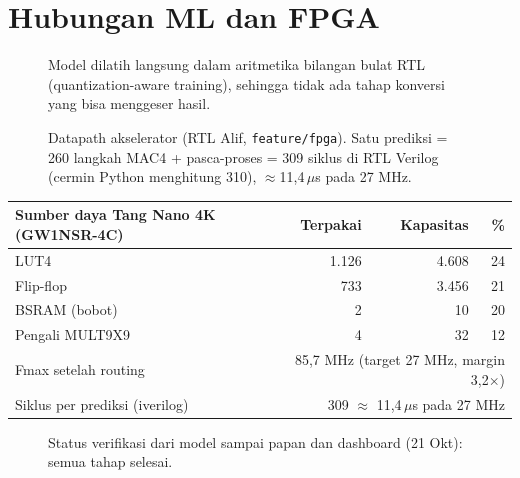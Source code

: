 \documentclass[10.5pt,a4paper]{article}
\newcommand{\diagram}[1]{}
\newcommand{\cmd}[1]{\texttt{#1}}
\begin{document}
\section{Hubungan ML dan FPGA}\label{sec:fpga}
\begin{figure}[h]
\centering\resizebox{0.95\linewidth}{!}{\diagram{fpga_alur}}
\caption{Model dilatih langsung dalam aritmetika bilangan bulat RTL (quantization-aware training), sehingga tidak ada tahap konversi yang bisa menggeser hasil.}
\end{figure}
\begin{figure}[h]
\centering\resizebox{0.95\linewidth}{!}{\diagram{mac4}}
\caption{Datapath akselerator (RTL Alif, \cmd{feature/fpga}). Satu prediksi = 260 langkah MAC4 + pasca-proses = 309 siklus di RTL Verilog (cermin Python menghitung 310), $\approx$11,4\,$\mu$s pada 27 MHz.}
\end{figure}
\begin{center}
\begin{tabular}{@{}l r r r@{}}
\toprule
Sumber daya Tang Nano 4K (GW1NSR-4C) & Terpakai & Kapasitas & \% \\
\midrule
LUT4 & 1.126 & 4.608 & 24 \\
Flip-flop & 733 & 3.456 & 21 \\
BSRAM (bobot) & 2 & 10 & 20 \\
Pengali MULT9X9 & 4 & 32 & 12 \\
\midrule
Fmax setelah routing & \multicolumn{3}{r}{85,7 MHz (target 27 MHz, margin 3,2$\times$)} \\
Siklus per prediksi (iverilog) & \multicolumn{3}{r}{309 $\approx$ 11,4\,$\mu$s pada 27 MHz} \\
\bottomrule
\end{tabular}
\end{center}
\begin{figure}[h]
\centering\resizebox{\linewidth}{!}{\diagram{verifikasi}}
\caption{Status verifikasi dari model sampai papan dan dashboard (21 Okt): semua tahap selesai.}\label{fig:verif}
\end{figure}
\end{document}
